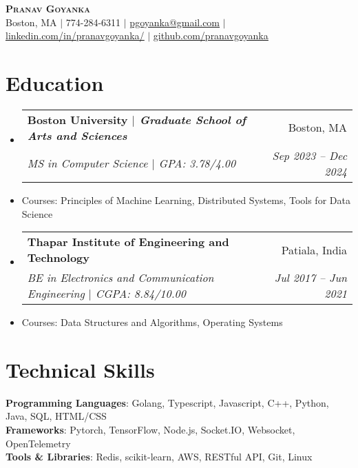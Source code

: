 \documentclass[letterpaper,11pt]{article}
\makeatletter
\newcommand{\resumeItem}[1]{
  \item\small{
    {#1 \vspace{-2pt}}
  }
}
\newcommand{\resumeSubheading}[4]{
  \vspace{-2pt}\item
    \begin{tabular*}{0.97\textwidth}[t]{l@{\extracolsep{\fill}}r}
      \textbf{#1} & #2 \\
      \textit{\small#3} & \textit{\small #4} \\
    \end{tabular*}\vspace{-7pt}
}
\newcommand{\resumeSubHeadingListStart}{\begin{itemize}[leftmargin=0.15in, label={}]}
\newcommand{\resumeSubHeadingListEnd}{\end{itemize}}
\makeatother
\begin{document}

\begin{center}
    \textbf{\Huge \scshape Pranav Goyanka} \\ \vspace{1pt}
    \small Boston, MA $|$
    \small 774-284-6311 $|$ \href{mailto:pgoyanka@gmail.com}{\underline{pgoyanka@gmail.com}} $|$ 
    \href{https://www.linkedin.com/in/pranavgoyanka/}{\underline{linkedin.com/in/pranavgoyanka/}} $|$
    \href{https://github.com/pranavgoyanka/}{\underline{github.com/pranavgoyanka}}
\end{center}

\section{Education}
  \resumeSubHeadingListStart
    \resumeSubheading
      {Boston University \textnormal{\emph{$|$ Graduate School of Arts and Sciences}}}{Boston, MA}
      {MS in Computer Science $|$ GPA: 3.78/4.00 }{Sep 2023 -- Dec 2024}
      \resumeItem{Courses: Principles of Machine Learning, Distributed Systems, Tools for Data Science}
    \resumeSubheading
      {Thapar Institute of Engineering and Technology}{Patiala, India}
      {BE in Electronics and Communication Engineering $|$ CGPA: 8.84/10.00 }{Jul 2017 -- Jun 2021}
      \resumeItem{Courses: Data Structures and Algorithms, Operating Systems}
  \resumeSubHeadingListEnd

\section{Technical Skills}
 \begin{itemize}[leftmargin=0.15in, label={}]
    \small{\item{
     \textbf{Programming Languages}{: Golang, Typescript, Javascript, C++, Python, Java,  SQL, HTML/CSS} \\
     \textbf{Frameworks}{: Pytorch, TensorFlow, Node.js, Socket.IO, Websocket, OpenTelemetry } \\
     \textbf{Tools \& Libraries}{: Redis, scikit-learn, AWS, RESTful API, Git, Linux} \\
    }}
 \end{itemize}
\end{document}
